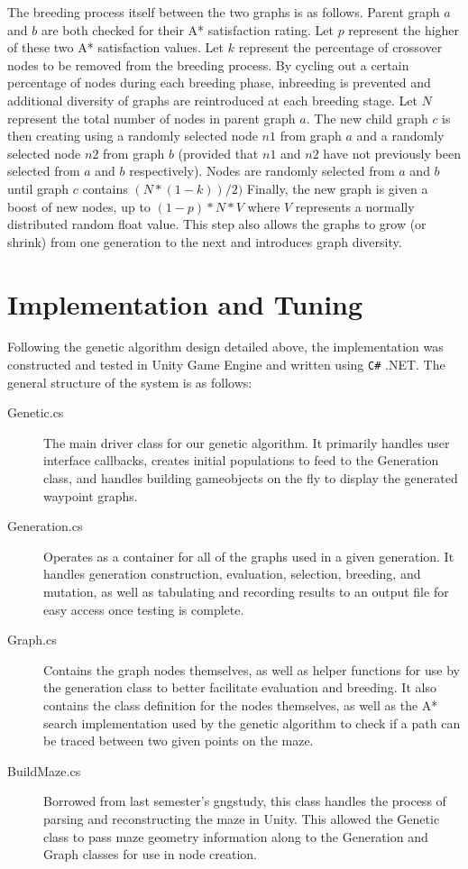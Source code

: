 	The breeding process itself between the two graphs is as follows. Parent graph \(a\) and \(b\) are both checked for their A* satisfaction rating. Let \(p\) represent the higher of these two A* satisfaction values. Let \(k\) represent the percentage of crossover nodes to be removed from the breeding process. By cycling out a certain percentage of nodes during each breeding phase, inbreeding is prevented and additional diversity of graphs are reintroduced at each breeding stage. Let \(N\) represent the total number of nodes in parent graph \(a\). The new child graph \(c\) is then creating using a randomly selected node \(n1\) from graph \(a\) and a randomly selected node \(n2\) from graph \(b\) (provided that \(n1\) and \(n2\) have not previously been selected from \(a\) and \(b\) respectively). Nodes are randomly selected from \(a\) and \(b\) until graph \(c\) contains \((N*(1-k))/2)\) Finally, the new graph is given a boost of new nodes, up to \((1-p)*N * V\) where \(V\) represents a normally distributed random float value. This step also allows the graphs to grow (or shrink) from one generation to the next and introduces graph diversity.

\section{Implementation and Tuning}

	Following the genetic algorithm design detailed above, the implementation was constructed and tested in Unity Game Engine and written using \texttt{C\#} .NET. The general structure of the system is as follows:	
	\begin{description}
		\item[Genetic.cs] The main driver class for our genetic algorithm. It primarily handles user interface callbacks, creates initial populations to feed to the Generation class, and handles building gameobjects on the fly to display the generated waypoint graphs.
		\item[Generation.cs] Operates as a container for all of the graphs used in a given generation. It handles generation construction, evaluation, selection, breeding, and mutation, as well as tabulating and recording results to an output file for easy access once testing is complete.
		\item[Graph.cs] Contains the graph nodes themselves, as well as helper functions for use by the generation class to better facilitate evaluation and breeding. It also contains the class definition for the nodes themselves, as well as the A* search implementation used by the genetic algorithm to check if a path can be traced between two given points on the maze.
		\item[BuildMaze.cs] Borrowed from last semester's gngstudy, this class handles the process of parsing and reconstructing the maze in Unity. This allowed the Genetic class to pass maze geometry information along to the Generation and Graph classes for use in node creation.
	\end{description}
	
